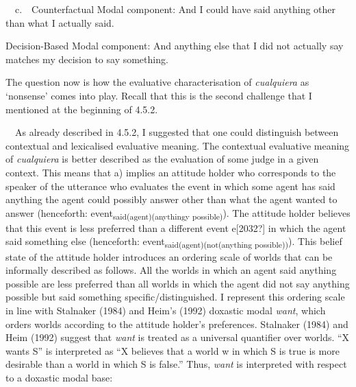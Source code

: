 \begin{styleStandard}
\ \ c.\ \ Counterfactual Modal component: And I could have said anything other than what I actually said.
\end{styleStandard}

\begin{styleStandard}
Decision-Based Modal component: And anything else that I did not actually say matches my decision to say something.
\end{styleStandard}

\begin{styleStandard}
The question now is how the evaluative characterisation of \textit{cualquiera} as ‘nonsense’ comes into play. Recall that this is the second challenge that I mentioned at the beginning of 4.5.2. 
\end{styleStandard}

\begin{styleStandard}
\ \ As already described in 4.5.2, I suggested that one could distinguish between contextual and lexicalised evaluative meaning. The contextual evaluative meaning of \textit{cualquiera} is better described as the evaluation of some judge in a given context. This means that a) implies an attitude holder who corresponds to the speaker of the utterance who evaluates the event in which some agent has said anything the agent could possibly answer other than what the agent wanted to answer (henceforth: event\textsubscript{said(agent)(anythingy possible)}). The attitude holder believes that this event is less preferred than a different event e[2032?] in which the agent said something else (henceforth: event\textsubscript{said(agent)(not(anything possible))}). This belief state of the attitude holder introduces an ordering scale of worlds that can be informally described as follows. All the worlds in which an agent said anything possible are less preferred than all worlds in which the agent did not say anything possible but said something specific/distinguished. I represent this ordering scale in line with Stalnaker (1984) and Heim’s (1992) doxastic modal \textit{want}, which orders worlds according to the attitude holder’s preferences. Stalnaker (1984) and Heim (1992) suggest that \textit{want} is treated as a universal quantifier over worlds. “X wants S” is interpreted as “X believes that a world w in which S is true is more desirable than a world in which S is false.” Thus, \textit{want} is interpreted with respect to a doxastic modal base: 
\end{styleStandard}

